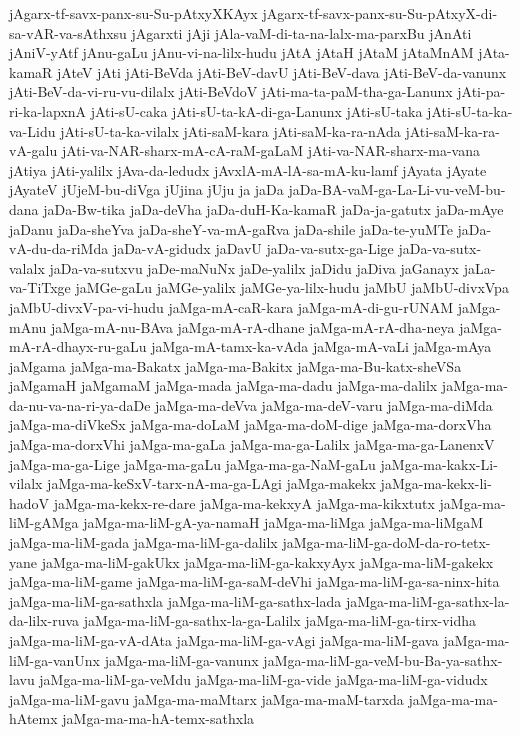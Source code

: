 {jAgarx-tf-savx-panx-su-Su-pAtxyXKAyx
jAgarx-tf-savx-panx-su-Su-pAtxyX-di-sa-vAR-va-sAthxsu
jAgarxti
jAji
jAla-vaM-di-ta-na-lalx-ma-parxBu
jAnAti
jAniV-yAtf
jAnu-gaLu
jAnu-vi-na-lilx-hudu
jAtA
jAtaH
jAtaM
jAtaMnAM
jAta-kamaR
jAteV
jAti
jAti-BeVda
jAti-BeV-davU
jAti-BeV-dava
jAti-BeV-da-vanunx
jAti-BeV-da-vi-ru-vu-dilalx
jAti-BeVdoV
jAti-ma-ta-paM-tha-ga-Lanunx
jAti-pa-ri-ka-lapxnA
jAti-sU-caka
jAti-sU-ta-kA-di-ga-Lanunx
jAti-sU-taka
jAti-sU-ta-ka-va-Lidu
jAti-sU-ta-ka-vilalx
jAti-saM-kara
jAti-saM-ka-ra-nAda
jAti-saM-ka-ra-vA-galu
jAti-va-NAR-sharx-mA-cA-raM-gaLaM
jAti-va-NAR-sharx-ma-vana
jAtiya
jAti-yalilx
jAva-da-ledudx
jAvxlA-mA-lA-sa-mA-ku-lamf
jAyata
jAyate
jAyateV
jUjeM-bu-diVga
jUjina
jUju
ja
jaDa
jaDa-BA-vaM-ga-La-Li-vu-veM-bu-dana
jaDa-Bw-tika
jaDa-deVha
jaDa-duH-Ka-kamaR
jaDa-ja-gatutx
jaDa-mAye
jaDanu
jaDa-sheYva
jaDa-sheY-va-mA-gaRva
jaDa-shile
jaDa-te-yuMTe
jaDa-vA-du-da-riMda
jaDa-vA-gidudx
jaDavU
jaDa-va-sutx-ga-Lige
jaDa-va-sutx-valalx
jaDa-va-sutxvu
jaDe-maNuNx
jaDe-yalilx
jaDidu
jaDiva
jaGanayx
jaLa-va-TiTxge
jaMGe-gaLu
jaMGe-yalilx
jaMGe-ya-lilx-hudu
jaMbU
jaMbU-divxVpa
jaMbU-divxV-pa-vi-hudu
jaMga-mA-caR-kara
jaMga-mA-di-gu-rUNAM
jaMga-mAnu
jaMga-mA-nu-BAva
jaMga-mA-rA-dhane
jaMga-mA-rA-dha-neya
jaMga-mA-rA-dhayx-ru-gaLu
jaMga-mA-tamx-ka-vAda
jaMga-mA-vaLi
jaMga-mAya
jaMgama
jaMga-ma-Bakatx
jaMga-ma-Bakitx
jaMga-ma-Bu-katx-sheVSa
jaMgamaH
jaMgamaM
jaMga-mada
jaMga-ma-dadu
jaMga-ma-dalilx
jaMga-ma-da-nu-va-na-ri-ya-daDe
jaMga-ma-deVva
jaMga-ma-deV-varu
jaMga-ma-diMda
jaMga-ma-diVkeSx
jaMga-ma-doLaM
jaMga-ma-doM-dige
jaMga-ma-dorxVha
jaMga-ma-dorxVhi
jaMga-ma-gaLa
jaMga-ma-ga-Lalilx
jaMga-ma-ga-LanenxV
jaMga-ma-ga-Lige
jaMga-ma-gaLu
jaMga-ma-ga-NaM-gaLu
jaMga-ma-kakx-Li-vilalx
jaMga-ma-keSxV-tarx-nA-ma-ga-LAgi
jaMga-makekx
jaMga-ma-kekx-li-hadoV
jaMga-ma-kekx-re-dare
jaMga-ma-kekxyA
jaMga-ma-kikxtutx
jaMga-ma-liM-gAMga
jaMga-ma-liM-gA-ya-namaH
jaMga-ma-liMga
jaMga-ma-liMgaM
jaMga-ma-liM-gada
jaMga-ma-liM-ga-dalilx
jaMga-ma-liM-ga-doM-da-ro-tetx-yane
jaMga-ma-liM-gakUkx
jaMga-ma-liM-ga-kakxyAyx
jaMga-ma-liM-gakekx
jaMga-ma-liM-game
jaMga-ma-liM-ga-saM-deVhi
jaMga-ma-liM-ga-sa-ninx-hita
jaMga-ma-liM-ga-sathxla
jaMga-ma-liM-ga-sathx-lada
jaMga-ma-liM-ga-sathx-la-da-lilx-ruva
jaMga-ma-liM-ga-sathx-la-ga-Lalilx
jaMga-ma-liM-ga-tirx-vidha
jaMga-ma-liM-ga-vA-dAta
jaMga-ma-liM-ga-vAgi
jaMga-ma-liM-gava
jaMga-ma-liM-ga-vanUnx
jaMga-ma-liM-ga-vanunx
jaMga-ma-liM-ga-veM-bu-Ba-ya-sathx-lavu
jaMga-ma-liM-ga-veMdu
jaMga-ma-liM-ga-vide
jaMga-ma-liM-ga-vidudx
jaMga-ma-liM-gavu
jaMga-ma-maMtarx
jaMga-ma-maM-tarxda
jaMga-ma-ma-hAtemx
jaMga-ma-ma-hA-temx-sathxla
}
